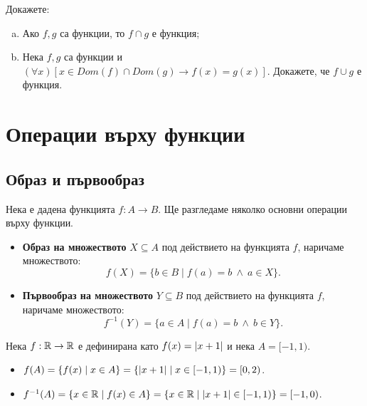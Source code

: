 \begin{problem}
  Докажете:
  \begin{enumerate}[a)]
  \item
    Ако $f,g$ са функции, то $f\cap g$ е функция;
  \item
    Нека $f,g$ са функции и $(\forall x)[x\in Dom(f)\cap Dom(g)\rightarrow f(x) = g(x)]$.
    Докажете, че $f\cup g$ е функция.
  \end{enumerate}
\end{problem}

\section{Операции върху функции}


\subsection*{Образ и първообраз}
Нека е дадена функцията $f:A\to B$.
Ще разгледаме няколко основни операции върху функции.

\begin{itemize}
\item 
  {\bf Образ на множеството} $X\subseteq A$ под действието на функцията $f$, наричаме
  множеството: \[f(X) = \{b\in B \mid f(a) = b\ \wedge\ a \in X\}.\]
\item
  {\bf Първообраз на множеството} $Y\subseteq B$ под действието на функцията $f$, наричаме
  множеството: \[f^{-1}(Y) = \{a\in A \mid f(a) = b\ \wedge\ b \in Y\}.\]
\end{itemize}


\begin{example}
  Нека $f:\mathbb{R}\to\mathbb{R}$ е дефинирана като $f(x) = \lvert{x+1}\rvert$ и нека $A = [-1,1)$.
  \begin{itemize}
  \item
    $f(A) = \{f(x) \mid x\in A\} = \{\lvert{x+1}\rvert \mid x \in [-1,1)\} = [0, 2)$.
  \item
    $f^{-1}(A) = \{x\in\mathbb{R}\mid f(x) \in A\} = \{x\in\mathbb{R}\mid \lvert{x+1}\rvert \in [-1,1)\} = [-1,0)$.
  \end{itemize}
\end{example}

